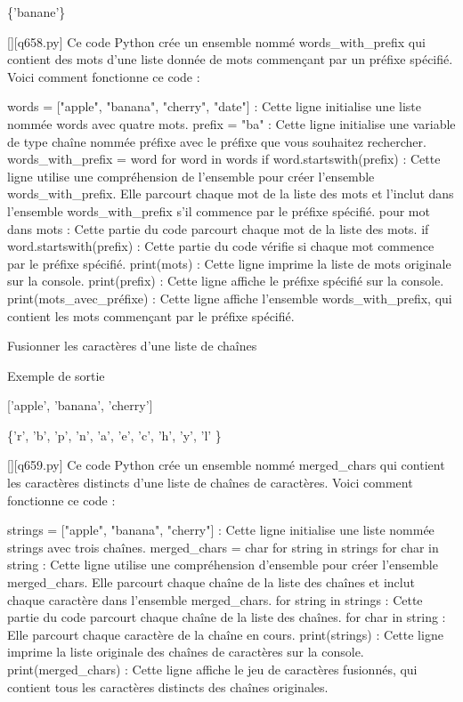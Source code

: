 \{'banane'\}
        \par
        \begin{solution}
            \renewcommand{\nomfichier}{q658.py}
            \pythonfile{\chemincode \nomfichier}[][\nomfichier]
            Ce code Python crée un ensemble nommé words_with_prefix qui contient des mots d'une liste donnée de mots commençant par un préfixe spécifié. Voici comment fonctionne ce code :

    words = ["apple", "banana", "cherry", "date"] : Cette ligne initialise une liste nommée words avec quatre mots.
    prefix = "ba" : Cette ligne initialise une variable de type chaîne nommée préfixe avec le préfixe que vous souhaitez rechercher.
    words_with_prefix = {word for word in words if word.startswith(prefix)} : Cette ligne utilise une compréhension de l'ensemble pour créer l'ensemble words_with_prefix. Elle parcourt chaque mot de la liste des mots et l'inclut dans l'ensemble words_with_prefix s'il commence par le préfixe spécifié.
        pour mot dans mots : Cette partie du code parcourt chaque mot de la liste des mots.
        if word.startswith(prefix) : Cette partie du code vérifie si chaque mot commence par le préfixe spécifié.
    print(mots) : Cette ligne imprime la liste de mots originale sur la console.
    print(prefix) : Cette ligne affiche le préfixe spécifié sur la console.
    print(mots_avec_préfixe) : Cette ligne affiche l'ensemble words_with_prefix, qui contient les mots commençant par le préfixe spécifié.
        \end{solution}
        

        \question
        Fusionner les caractères d'une liste de chaînes

Exemple de sortie

['apple', 'banana', 'cherry']

\{'r', 'b', 'p', 'n', 'a', 'e', 'c', 'h', 'y', 'l' \}
        \par
        \begin{solution}
            \renewcommand{\nomfichier}{q659.py}
            \pythonfile{\chemincode \nomfichier}[][\nomfichier]
            Ce code Python crée un ensemble nommé merged_chars qui contient les caractères distincts d'une liste de chaînes de caractères. Voici comment fonctionne ce code :

    strings = ["apple", "banana", "cherry"] : Cette ligne initialise une liste nommée strings avec trois chaînes.
    merged_chars = {char for string in strings for char in string} : Cette ligne utilise une compréhension d'ensemble pour créer l'ensemble merged_chars. Elle parcourt chaque chaîne de la liste des chaînes et inclut chaque caractère dans l'ensemble merged_chars.
        for string in strings : Cette partie du code parcourt chaque chaîne de la liste des chaînes.
        for char in string : Elle parcourt chaque caractère de la chaîne en cours.
    print(strings) : Cette ligne imprime la liste originale des chaînes de caractères sur la console.
    print(merged_chars) : Cette ligne affiche le jeu de caractères fusionnés, qui contient tous les caractères distincts des chaînes originales.
        \end{solution}
        

